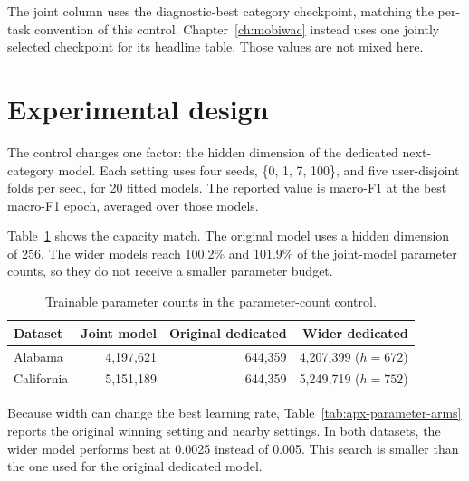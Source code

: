 The joint column uses the diagnostic-best category checkpoint, matching the
per-task convention of this control. Chapter~\ref{ch:mobiwac} instead uses one
jointly selected checkpoint for its headline table. Those values are not mixed here.

\section{Experimental design}
\label{sec:apx-parameter-design}

The control changes one factor: the hidden dimension of the dedicated
next-category model. Each setting uses four seeds, \{0, 1, 7, 100\}, and five
user-disjoint folds per seed, for 20 fitted models. The reported value is macro-F1
at the best macro-F1 epoch, averaged over those models.

Table~\ref{tab:apx-parameter-counts} shows the capacity match. The original model
uses a hidden dimension of 256. The wider models reach 100.2\% and 101.9\% of the
joint-model parameter counts, so they do not receive a smaller parameter budget.

\begin{table}[H]
    \centering
    \caption{Trainable parameter counts in the parameter-count control.}
    \label{tab:apx-parameter-counts}
    \begin{tabular}{lrrr}
        \toprule
        Dataset & Joint model & Original dedicated & Wider dedicated \\
        \midrule
        Alabama    & 4,197,621 & 644,359 & 4,207,399 ($h=672$) \\
        California & 5,151,189 & 644,359 & 5,249,719 ($h=752$) \\
        \bottomrule
    \end{tabular}
\end{table}

Because width can change the best learning rate,
Table~\ref{tab:apx-parameter-arms} reports the original winning setting and nearby
settings. In both datasets, the wider model performs best at 0.0025 instead of
0.005. This search is smaller than the one used for the original dedicated model.

